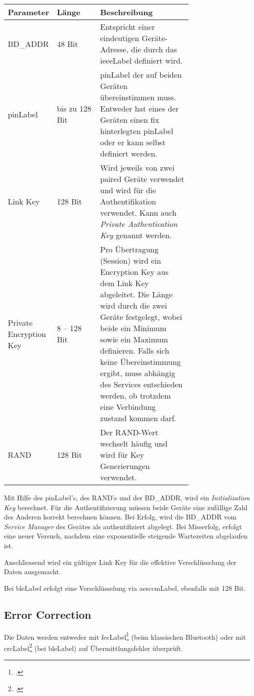 \begin{table}[H]
	\small\sffamily\renewcommand{\arraystretch}{1.4}
	\begin{tabular}{p{0.25\linewidth}lp{0.5\linewidth}}
		\toprule
		Parameter & Länge & Beschreibung \\
		\midrule
		BD\_ADDR & 48 Bit & Entspricht einer eindeutigen Geräte-Adresse, die durch das \gls{ieeeLabel} definiert wird.\\
		\gls{pinLabel} & bis zu 128 Bit & \gls{pinLabel} der auf beiden Geräten übereinstimmen muss. Entweder hat eines der Geräten einen fix hinterlegten \gls{pinLabel} oder er kann selbst definiert werden.\\
		Link Key & 128 Bit  & Wird jeweils von zwei paired Geräte verwendet und wird für die Authentifikation verwendet. Kann auch \textit{Private Authentication Key} genannt werden.\\
		Private Encryption Key & 8 -- 128 Bit & Pro Übertragung (Session) wird ein Encryption Key aus dem Link Key abgeleitet. Die Länge wird durch die zwei Geräte festgelegt, wobei beide ein Minimum sowie ein Maximum definieren. Falls sich keine Übereinstimmung ergibt, muss abhängig des Services entschieden werden, ob trotzdem eine Verbindung zustand kommen darf. \\
		RAND & 128 Bit & Der RAND-Wert wechselt häufig und wird für Key Generierungen verwendet.\\
		\bottomrule
	\end{tabular}
\end{table}

Mit Hilfe des \gls{pinLabel}'s, des RAND's und der BD\_ADDR, wird ein \textit{Initialization Key} berechnet.
Für die Authentifizierung müssen beide Geräte eine zufällige Zahl des Anderen korrekt berechnen können.
Bei Erfolg, wird die BD\_ADDR vom \textit{Service Manager} des Gerätes als authentifiziert abgelegt.
Bei Misserfolg, erfolgt eine neuer Versuch, nachdem eine exponentielle steigende Wartezeiten abgelaufen ist.

Anschliessend wird ein gültiger Link Key für die effektive Verschlüsselung der Daten ausgemacht.

Bei \gls{bleLabel} erfolgt eine Verschlüsselung via \gls{aesccmLabel}, ebenfalls mit 128 Bit.

\subsection{Error Correction}
Die Daten werden entweder mit \gls{fecLabel}\footcite{Forward_error_correction_Wikipedia_2015-04-27} (beim klassischen Bluetooth) oder mit \gls{crcLabel}\footcite{Cyclic_redundancy_check_Wikipedia_2015-04-27} (bei \gls{bleLabel}) auf Übermittlungsfehler überprüft.

